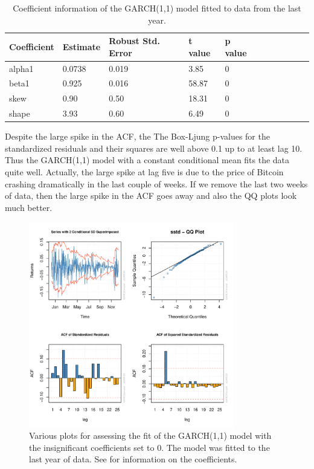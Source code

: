 \documentclass[12pt]{article}
\begin{document}
\begin{table}[h!]
\begin{center}
\begin{tabular}{|l | l | l | l | l | l | l | l | l | l | l |}
\hline
Coefficient & Estimate & Robust Std. Error & t value & p value\\\hline
alpha1 & 0.0738 & 0.019 & 3.85 & 0\\
beta1  & 0.925 & 0.016 & 58.87 & 0\\
skew & 0.90 & 0.50 & 18.31 & 0\\
shape & 3.93 & 0.60 & 6.49 & 0\\
\hline
\end{tabular}
\caption{Coefficient information of the GARCH(1,1) model fitted to data from the last year.}
\label{tab:garch_one_year_coeffs}
\end{center}
\end{table}

\clearpage

Despite the large spike in the ACF, the The Box-Ljung p-values for the standardized residuals and their squares are well above 0.1 up to at least lag 10. Thus the GARCH(1,1) model with a constant conditional mean fits the data quite well. Actually, the large spike at lag five is due to the price of Bitcoin crashing dramatically in the last couple of weeks. If we remove the last two weeks of data, then the large spike in the ACF goes away and also the QQ plots look much better.

\begin{figure}[h!]
    \centering
    \includegraphics[width=0.8\textwidth]{garch_one_year_fit.pdf}
    \caption{Various plots for assessing the fit of the GARCH(1,1) model with the insignificant coefficients set to 0. The model was fitted to the last year of data. See  for information on the coefficients.}
    \label{fig:garch_one_year_fit}
\end{figure}
\end{document}
